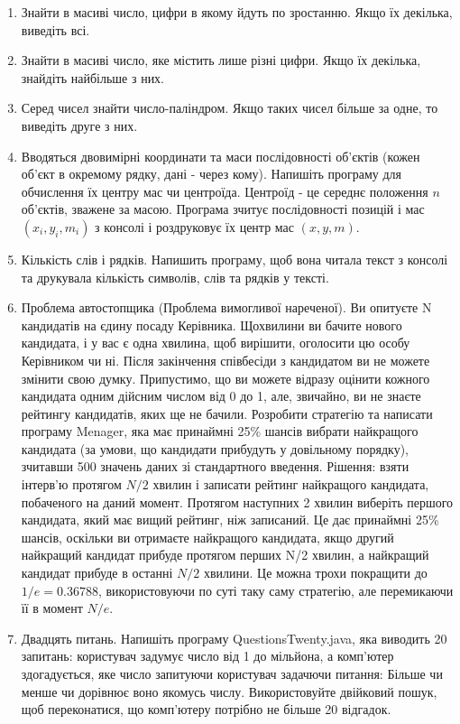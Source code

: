 \documentclass[]{article}
\begin{document}
\begin{enumerate}
\item Знайти в масиві число, цифри в якому йдуть по зростанню. Якщо їх декілька, виведіть всі.

\item Знайти в масиві число, яке містить лише різні цифри. Якщо їх декілька, знайдіть найбільше з них.

\item Серед чисел знайти число-паліндром. Якщо таких чисел більше за одне, то виведіть друге з них.



\item
Вводяться двовимірні координати та маси послідовності об’єктів (кожен об'єкт в окремому рядку, дані - через кому). 
Напишіть програму для обчислення їх центру мас чи центроїда.
Центроїд - це середнє положення $n$ об'єктів, зважене за масою. Програма зчитує послідовності позицій і мас $(x_i, y_i, m_i)$
 з консолі і роздруковує їх центр мас $(x, y, m)$.

\item
Кількість слів і рядків. Напишить програму, щоб вона читала текст з консолі та
 друкувала кількість символів, слів та рядків у тексті.


\item Проблема автостопщика (Проблема вимогливої нареченої). Ви опитуєте N кандидатів на єдину посаду Керівника.
Щохвилини ви бачите нового кандидата, і у вас є одна хвилина, щоб вирішити, оголосити цю особу Керівником чи ні.
Після закінчення співбесіди з кандидатом ви не можете змінити свою думку.
 Припустимо, що ви можете відразу оцінити кожного кандидата одним дійсним числом від 0 до 1, але, звичайно,
ви не знаєте рейтингу кандидатів, яких ще не бачили.
Розробити стратегію та написати програму Menager, яка має принаймні 25\% шансів вибрати найкращого кандидата 
(за умови, що кандидати прибудуть у довільному порядку), зчитавши 500 значень даних зі стандартного введення.
Рішення: взяти інтерв’ю протягом $N/2$ хвилин і записати рейтинг найкращого кандидата, побаченого на даний момент.
Протягом наступних 2 хвилин виберіть першого кандидата, який має вищий рейтинг, ніж записаний. Це дає принаймні 25\% шансів, оскільки ви отримаєте найкращого кандидата, якщо другий найкращий кандидат прибуде протягом перших N/2 хвилин,
а найкращий кандидат прибуде в останні $N/2$ хвилини. Це можна трохи покращити до $1/e = 0.36788$, використовуючи по суті таку саму стратегію, але перемикаючи її в момент $N/e$.

\item
Двадцять питань.
 Напишіть програму QuestionsTwenty.java, яка виводить 20 запитань:
 користувач задумує число від 1 до мільйона, а комп’ютер здогадується, яке число запитуючи користувач задачючи питання:
Більше чи менше чи дорівнює воно якомусь числу.
Використовуйте двійковий пошук, щоб переконатися, що комп’ютеру потрібно не більше 20 відгадок.



\end{enumerate}
\end{document}
